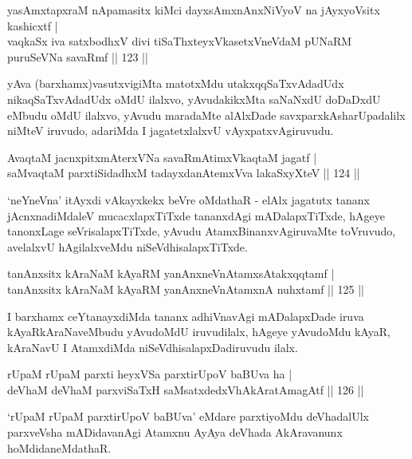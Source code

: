 \begin{shl}
yasAmxtapxraM nApamasitx kiMci dayxsAmxnAnxNiVyoV na jAyxyoV\s sitx kashicxtf |\\
vaqkaSx iva satxbodhxV divi tiSaThxteyxVkasetxVneVdaM pUNaRM puruSeVNa savaRmf \hfill || 123 ||
\end{shl}

\begin{artha}
yAva (barxhamx)vasutxvigiMta matotxMdu utakxqqSaTxvAdadUdx nikaqSaTxvAdadUdx oMdU ilalxvo, yAvudakikxMta saNaNxdU doDaDxdU eMbudu oMdU ilalxvo, yAvudu maradaMte alAlxDade savxparxkAsharUpadalilx niMteV iruvudo, adariMda I jagatetxlalxvU vAyxpatxvAgiruvudu.
\end{artha}

\begin{shl}
AvaqtaM jacnxpitxmAterxVNa savaRmAtimxVkaqtaM jagatf |\\
saMvaqtaM parxtiSidadhxM tadayxdanAtemxVva lakaSxyXteV \hfill || 124 ||
\end{shl}

\begin{artha}
`neYneVna' itAyxdi vAkayxkekx beVre oMdathaR - elAlx jagatutx tananx
  jAcnxnadiMdaleV mucacxlapxTiTxde tananxdAgi mADalapxTiTxde, hAgeye
  tanonxLage seVrisalapxTiTxde, yAvudu AtamxBinanxvAgiruvaMte
  toVruvudo, avelalxvU hAgilalxveMdu niSeVdhisalapxTiTxde.
\end{artha}

\begin{shl}
tanAnxsitx kAraNaM kAyaRM yanAnxneVnA\s \s tamxsAtakxqqtamf |\\
tanAnxsitx kAraNaM kAyaRM yanAnxneVnA\s \s tamxnA nuhxtamf \hfill || 125 ||
\end{shl}

\begin{artha}
I barxhamx ceYtanayxdiMda tananx adhiVnavAgi mADalapxDade iruva kAyaRkAraNaveMbudu yAvudoMdU iruvudilalx, hAgeye yAvudoMdu kAyaR, kAraNavU I AtamxdiMda niSeVdhisalapxDadiruvudu ilalx.
\end{artha}


\begin{shl}
rUpaM rUpaM parxti heyxVSa parxtirUpoV baBUva ha |\\
deVhaM deVhaM parxviSaTxH saMsatxdedxVhAkAratAmagAtf \hfill || 126 ||
\end{shl}

\begin{artha}
`rUpaM rUpaM parxtirUpoV baBUva' eMdare parxtiyoMdu deVhadalUlx parxveVsha mADidavanAgi   Atamxnu AyAya deVhada AkAravanunx hoMdidaneMdathaR.
\end{artha}

